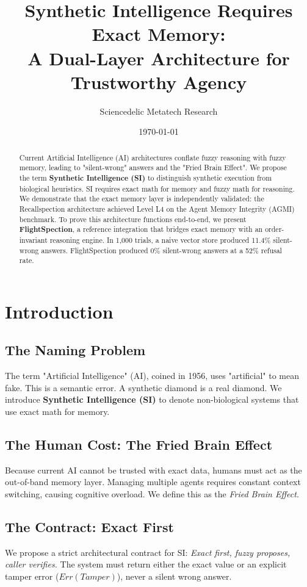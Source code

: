 \documentclass[11pt, a4paper]{article}
\title{\textbf{Synthetic Intelligence Requires Exact Memory:\\ A Dual-Layer Architecture for Trustworthy Agency}}
\author{Sciencedelic Metatech Research}
\date{\today}
\begin{document}
\maketitle

\begin{abstract}
Current Artificial Intelligence (AI) architectures conflate fuzzy reasoning with fuzzy memory, leading to "silent-wrong" answers and the "Fried Brain Effect". We propose the term \textbf{Synthetic Intelligence (SI)} to distinguish synthetic execution from biological heuristics. SI requires exact math for memory and fuzzy math for reasoning. We demonstrate that the exact memory layer is independently validated: the Recallspection architecture achieved Level L4 on the Agent Memory Integrity (AGMI) benchmark. To prove this architecture functions end-to-end, we present \textbf{FlightSpection}, a reference integration that bridges exact memory with an order-invariant reasoning engine. In 1,000 trials, a naive vector store produced 11.4\% silent-wrong answers. FlightSpection produced 0\% silent-wrong answers at a 52\% refusal rate.
\end{abstract}

\section{Introduction}
\subsection{The Naming Problem}
The term "Artificial Intelligence" (AI), coined in 1956, uses "artificial" to mean fake. This is a semantic error. A synthetic diamond is a real diamond. We introduce \textbf{Synthetic Intelligence (SI)} to denote non-biological systems that use exact math for memory.

\subsection{The Human Cost: The Fried Brain Effect}
Because current AI cannot be trusted with exact data, humans must act as the out-of-band memory layer. Managing multiple agents requires constant context switching, causing cognitive overload. We define this as the \textit{Fried Brain Effect}.

\subsection{The Contract: Exact First}
We propose a strict architectural contract for SI: \textit{Exact first, fuzzy proposes, caller verifies.} The system must return either the exact value or an explicit tamper error ($Err(Tamper)$), never a silent wrong answer.
\end{document}
